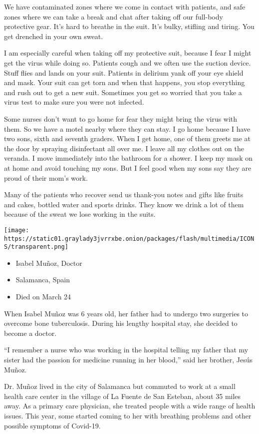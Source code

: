 We have contaminated zones where we come in contact with patients, and
safe zones where we can take a break and chat after taking off our
full-body protective gear. It's hard to breathe in the suit. It's bulky,
stifling and tiring. You get drenched in your own sweat.

I am especially careful when taking off my protective suit, because I
fear I might get the virus while doing so. Patients cough and we often
use the suction device. Stuff flies and lands on your suit. Patients in
delirium yank off your eye shield and mask. Your suit can get torn and
when that happens, you stop everything and rush out to get a new suit.
Sometimes you get so worried that you take a virus test to make sure you
were not infected.

Some nurses don't want to go home for fear they might bring the virus
with them. So we have a motel nearby where they can stay. I go home
because I have two sons, sixth and seventh graders. When I get home, one
of them greets me at the door by spraying disinfectant all over me. I
leave all my clothes out on the veranda. I move immediately into the
bathroom for a shower. I keep my mask on at home and avoid touching my
sons. But I feel good when my sons say they are proud of their mom's
work.

Many of the patients who recover send us thank-you notes and gifts like
fruits and cakes, bottled water and sports drinks. They know we drink a
lot of them because of the sweat we lose working in the suits.

\texttt{[image: https://static01.graylady3jvrrxbe.onion/packages/flash/multimedia/ICONS/transparent.png]}

\begin{itemize}
\tightlist
\item
  Isabel Muñoz, Doctor
\item
  Salamanca, Spain
\item
  Died on March 24
\end{itemize}

When Isabel Muñoz was 6 years old, her father had to undergo two
surgeries to overcome bone tuberculosis. During his lengthy hospital
stay, she decided to become a doctor.

``I remember a nurse who was working in the hospital telling my father
that my sister had the passion for medicine running in her blood,'' said
her brother, Jesús Muñoz.

Dr. Muñoz lived in the city of Salamanca but commuted to work at a small
health care center in the village of La Fuente de San Esteban, about 35
miles away. As a primary care physician, she treated people with a wide
range of health issues. This year, some started coming to her with
breathing problems and other possible symptoms of Covid-19.

